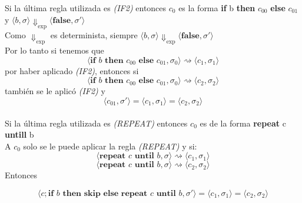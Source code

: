 \documentclass{article}
\begin{document}
Si la última regla utilizada es \textit{(IF2)} entonces \(c_0\) es la forma \textbf{if} b \textbf{then} \(c_{00}\) \textbf{else} \(c_{01}\)  y  \( \langle b, \sigma \rangle  \Downarrow_{\text{exp}} \langle \textbf{false}, \sigma' \rangle\) \\
Como \(\Downarrow_{\text{exp}}\) es determinista, siempre \( \langle b, \sigma \rangle  \Downarrow_{\text{exp}} \langle \textbf{false}, \sigma' \rangle\)\\
Por lo tanto si tenemos que
\[ \langle \textbf{if } b\textbf{ then } c_{00} \textbf{ else } c_{01}, \sigma_0 \rangle \rightsquigarrow \langle c_1, \sigma_1 \rangle\]
por haber aplicado \textit{(IF2)}, entonces si
\[ \langle \textbf{if } b\textbf{ then } c_{00} \textbf{ else } c_{01}, \sigma_0 \rangle \rightsquigarrow \langle c_2, \sigma_2 \rangle\]
también se le aplicó \textit{(IF2)} y \[ \langle c_{01}, \sigma'\rangle = \langle c_1, \sigma_1 \rangle = \langle c_2, \sigma_2 \rangle\]\\

Si la última regla utilizada es \textit{(REPEAT)} entonces \(c_0\) es de la forma \textbf{repeat} c \textbf{untill} b\\
A \(c_0\) solo se le puede aplicar la regla \textit{(REPEAT)} y si:
\[ \langle \textbf{repeat } c \textbf{ until } b,\sigma\rangle \rightsquigarrow  \langle c_1, \sigma_1\rangle\]
\[ \langle \textbf{repeat } c \textbf{ until } b,\sigma\rangle \rightsquigarrow  \langle c_2, \sigma_2\rangle\]
Entonces

\[\langle c;\textbf{if } b \textbf{ then skip else repeat } c \textbf{ until } b, \sigma'\rangle = \langle c_1, \sigma_1\rangle = \langle c_2, \sigma_2\rangle\]\\
\end{document}
